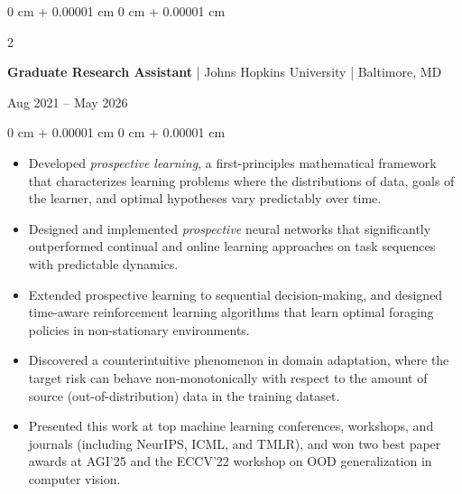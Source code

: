 \documentclass[10pt, letterpaper]{article}
\newenvironment{highlights}{
    \begin{itemize}[
        topsep=0.10 cm,
        parsep=0.10 cm,
        partopsep=0pt,
        itemsep=0pt,
        leftmargin=0 cm + 10pt
    ]
}{
    \end{itemize}
} %
\newenvironment{onecolentry}{
    \begin{adjustwidth}{
        0 cm + 0.00001 cm
    }{
        0 cm + 0.00001 cm
    }
}{
    \end{adjustwidth}
} %
\newenvironment{twocolentry}[2][]{
    \onecolentry
    \def\secondColumn{#2}
    \setcolumnwidth{\fill, 4.5 cm}
    \begin{paracol}{2}
}{
    \switchcolumn \raggedleft \secondColumn\strut
    \end{paracol}
    \endonecolentry
} %
\begin{document}
        \begin{twocolentry}{Aug 2021 – May 2026}
        \textbf{Graduate Research Assistant} | Johns Hopkins University | Baltimore, MD
        \end{twocolentry}
        \vspace{0.10 cm}
        \begin{onecolentry}
            \begin{highlights}
                \item Developed \textit{prospective learning}, a first-principles mathematical framework that characterizes learning problems where the distributions of data, goals of the learner, and optimal hypotheses vary predictably over time.
                \item Designed and implemented \textit{prospective} neural networks that significantly outperformed continual and online learning approaches on task sequences with predictable dynamics.
                \item Extended prospective learning to sequential decision-making, and designed time-aware reinforcement learning algorithms that learn optimal foraging policies in non-stationary environments.
                \item Discovered a counterintuitive phenomenon in domain adaptation, where the target risk can behave non-monotonically with respect to the amount of source (out-of-distribution) data in the training dataset.
                \item Presented this work at top machine learning conferences, workshops, and journals (including NeurIPS, ICML, and TMLR), and won two best paper awards at AGI'25 and the ECCV'22 workshop on OOD generalization in computer vision.
            \end{highlights}
        \end{onecolentry}

        \vspace{0.2 cm}
\end{document}

